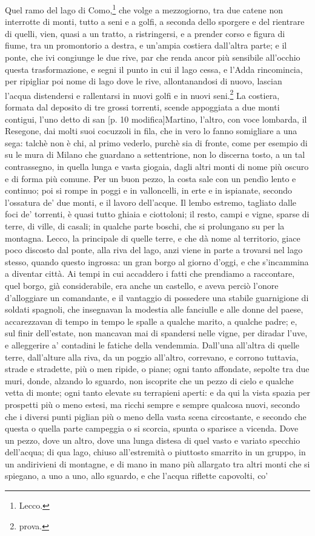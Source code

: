 \documentclass[11pt,a4paper]{book}
\begin{document}
\beginnumbering
\pstart
Quel ramo del lago di Como,\footnote{Lecco.} che volge a mezzogiorno, tra due catene non interrotte di monti, tutto a seni e a golfi, a seconda dello sporgere e del rientrare di quelli, vien, quasi a un tratto, a ristringersi, e a prender corso e figura di fiume, tra un promontorio a destra, e un’ampia costiera dall’altra parte; e il ponte, che ivi congiunge le due rive, par che renda ancor più sensibile all’occhio questa trasformazione, e segni il punto in cui il lago cessa, e l’Adda rincomincia, per ripigliar poi nome di lago dove le rive, allontanandosi di nuovo, lascian l’acqua distendersi e rallentarsi in nuovi golfi e in nuovi seni.\footnote{prova.} La costiera, formata dal deposito di tre grossi torrenti, scende appoggiata a due monti contigui, l’uno detto di san [p. 10 modifica]Martino, l’altro, con voce lombarda, il Resegone, dai molti suoi cocuzzoli in fila, che in vero lo fanno somigliare a una sega: talchè non è chi, al primo vederlo, purchè sia di fronte, come per esempio di su le mura di Milano che guardano a settentrione, non lo discerna tosto, a un tal contrassegno, in quella lunga e vasta giogaia, dagli altri monti di nome più oscuro e di forma più comune. Per un buon pezzo, la costa sale con un pendìo lento e continuo; poi si rompe in poggi e in valloncelli, in erte e in ispianate, secondo l’ossatura de’ due monti, e il lavoro dell’acque. Il lembo estremo, tagliato dalle foci de’ torrenti, è quasi tutto ghiaia e ciottoloni; il resto, campi e vigne, sparse di terre, di ville, di casali; in qualche parte boschi, che si prolungano su per la montagna. Lecco, la principale di quelle terre, e che dà nome al territorio, giace poco discosto dal ponte, alla riva del lago, anzi viene in parte a trovarsi nel lago stesso, quando questo ingrossa: un gran borgo al giorno d’oggi, e che s’incammina a diventar città. Ai tempi in cui accaddero i fatti che prendiamo a raccontare, quel borgo, già considerabile, era anche un castello, e aveva perciò l’onore d’alloggiare un comandante, e il vantaggio di possedere una stabile guarnigione di soldati spagnoli, che insegnavan la modestia alle fanciulle e alle donne del paese, accarezzavan di tempo in tempo le spalle a qualche marito, a qualche padre; e, sul finir dell’estate, non mancavan mai di spandersi nelle vigne, per diradar l’uve, e alleggerire a’ contadini le fatiche della vendemmia. Dall’una all’altra di quelle terre, dall’alture alla riva, da un poggio all’altro, correvano, e corrono tuttavia, strade e stradette, più o men ripide, o piane; ogni tanto affondate, sepolte tra due muri, donde, alzando lo sguardo, non iscoprite che un pezzo di cielo e qualche vetta di monte; ogni tanto elevate su terrapieni aperti: e da qui la vista spazia per prospetti più o meno estesi, ma ricchi sempre e sempre qualcosa nuovi, secondo che i diversi punti piglian più o meno della vasta scena circostante, e secondo che questa o quella parte campeggia o si scorcia, spunta o sparisce a vicenda. Dove un pezzo, dove un altro, dove una lunga distesa di quel vasto e variato specchio dell’acqua; di qua lago, chiuso all’estremità o piuttosto smarrito in un gruppo, in un andirivieni di montagne, e di mano in mano più allargato tra altri monti che si spiegano, a uno a uno, allo sguardo, e che l’acqua riflette capovolti, co’ 
\end{document}
